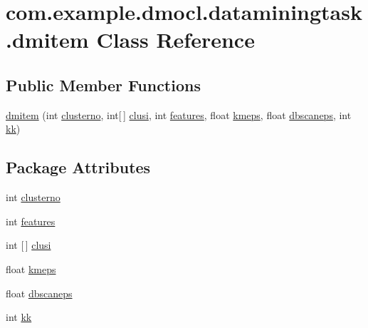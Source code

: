 \hypertarget{classcom_1_1example_1_1dmocl_1_1dataminingtask_1_1dmitem}{}\section{com.\+example.\+dmocl.\+dataminingtask.\+dmitem Class Reference}
\label{classcom_1_1example_1_1dmocl_1_1dataminingtask_1_1dmitem}
\subsection*{Public Member Functions}
\begin{DoxyCompactItemize}
\item 
\mbox{\hyperlink{classcom_1_1example_1_1dmocl_1_1dataminingtask_1_1dmitem_aa5f9d03e960cac870be4e466440da584}{dmitem}} (int \mbox{\hyperlink{classcom_1_1example_1_1dmocl_1_1dataminingtask_1_1dmitem_a5f29525bad39601e69200723b734e385}{clusterno}}, int\mbox{[}$\,$\mbox{]} \mbox{\hyperlink{classcom_1_1example_1_1dmocl_1_1dataminingtask_1_1dmitem_acf27196dadb807384e55b16b4b1bb5ac}{clusi}}, int \mbox{\hyperlink{classcom_1_1example_1_1dmocl_1_1dataminingtask_1_1dmitem_a8c9b4d25e653d245858486d3390f8642}{features}}, float \mbox{\hyperlink{classcom_1_1example_1_1dmocl_1_1dataminingtask_1_1dmitem_a67df814e58c72743fd49a91ae01b4761}{kmeps}}, float \mbox{\hyperlink{classcom_1_1example_1_1dmocl_1_1dataminingtask_1_1dmitem_ac7280c9918f0e48dcba935b7e2f98540}{dbscaneps}}, int \mbox{\hyperlink{classcom_1_1example_1_1dmocl_1_1dataminingtask_1_1dmitem_a450358be14d0eaf46b372a41eb4d3046}{kk}})
\end{DoxyCompactItemize}
\subsection*{Package Attributes}
\begin{DoxyCompactItemize}
\item 
int \mbox{\hyperlink{classcom_1_1example_1_1dmocl_1_1dataminingtask_1_1dmitem_a5f29525bad39601e69200723b734e385}{clusterno}}
\item 
int \mbox{\hyperlink{classcom_1_1example_1_1dmocl_1_1dataminingtask_1_1dmitem_a8c9b4d25e653d245858486d3390f8642}{features}}
\item 
int \mbox{[}$\,$\mbox{]} \mbox{\hyperlink{classcom_1_1example_1_1dmocl_1_1dataminingtask_1_1dmitem_acf27196dadb807384e55b16b4b1bb5ac}{clusi}}
\item 
float \mbox{\hyperlink{classcom_1_1example_1_1dmocl_1_1dataminingtask_1_1dmitem_a67df814e58c72743fd49a91ae01b4761}{kmeps}}
\item 
float \mbox{\hyperlink{classcom_1_1example_1_1dmocl_1_1dataminingtask_1_1dmitem_ac7280c9918f0e48dcba935b7e2f98540}{dbscaneps}}
\item 
int \mbox{\hyperlink{classcom_1_1example_1_1dmocl_1_1dataminingtask_1_1dmitem_a450358be14d0eaf46b372a41eb4d3046}{kk}}
\end{DoxyCompactItemize}


